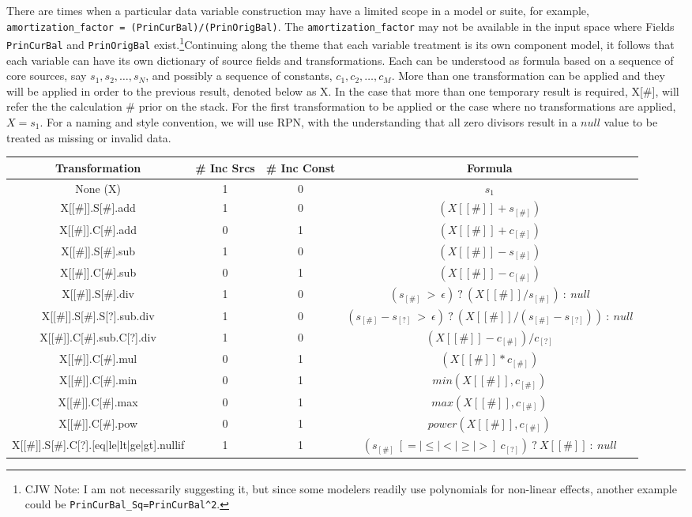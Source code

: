 \documentclass[10pt]{article}
\begin{document}
There are times when a particular data variable construction may have a limited scope in a model or suite, for example, {\tt
amortization\_factor = (PrinCurBal)/(PrinOrigBal)}.  The {\tt amortization\_factor} may not be available in the input space where Fields {\tt
PrinCurBal} and {\tt PrinOrigBal} exist.\ifcommentary \footnote{CJW Note:  I am not necessarily suggesting it, but since some modelers readily use
polynomials for non-linear effects, another example could be {\tt PrinCurBal\_Sq=PrinCurBal\^{}2}.}\fi  Continuing along the theme that each
variable treatment is its own component model, it follows that each variable can have its own dictionary of source fields and
transformations.  Each can be understood as formula based on a sequence of core sources, say $s_1, s_2,\ldots, s_N$, and possibly a sequence
of constants, $c_1, c_2, \ldots, c_M$. More than one transformation can be applied and they will be applied in order to the previous result,
denoted below as X.  In the case that more than one temporary result is required, X[\#], will refer the the calculation \# prior on the
stack.  For the first transformation to be applied or the case where no transformations are applied, $X=s_1$. For a naming and
style convention, we will use RPN, with the understanding that all zero divisors result in a $null$ value to be treated as missing or invalid data.

\noindent
\begin{tabular}{|c|c|c|c|}\hline
    Transformation &  \# Inc Srcs & \# Inc Const & Formula \tallstrut \\ \hline
    None (X)        & 1 & 0 & $s_1$ \tallstrut \\ \hline
    X[[\#]].S[\#].add    & 1 & 0 & $(X[[\#]]+s_{[\#]})$ \tallstrut \\ \hline
    X[[\#]].C[\#].add    & 0 & 1 & $(X[[\#]]+c_{[\#]})$ \tallstrut \\ \hline
    X[[\#]].S[\#].sub    & 1 & 0 & $(X[[\#]]-s_{[\#]})$ \tallstrut \\ \hline
    X[[\#]].C[\#].sub    & 0 & 1 & $(X[[\#]]-c_{[\#]})$ \tallstrut \\ \hline
    X[[\#]].S[\#].div    & 1 & 0 & $(s_{[\#]}~>~\epsilon)~?~(X[[\#]]/s_{[\#]})~:~null$ \tallstrut \\ \hline
    X[[\#]].S[\#].S[?].sub.div    & 1 & 0 & $(s_{[\#]}-s_{[?]}~>~\epsilon)~?~(X[[\#]]/(s_{[\#]}-s_{[?]}))~:~null$ \tallstrut \\ \hline
    X[[\#]].C[\#].sub.C[?].div    & 1 & 0 & $(X[[\#]]-c_{[\#]})/c_{[?]}$ \tallstrut \\ \hline
    X[[\#]].C[\#].mul    & 0 & 1 & $(X[[\#]]*c_{[\#]})$ \tallstrut \\ \hline
    X[[\#]].C[\#].min    & 0 & 1 & $min(X[[\#]],c_{[\#]})$ \tallstrut \\ \hline
    X[[\#]].C[\#].max    & 0 & 1 & $max(X[[\#]],c_{[\#]})$ \tallstrut \\ \hline
    X[[\#]].C[\#].pow    & 0 & 1 & $power(X[[\#]],c_{[\#]})$ \tallstrut \\ \hline
    X[[\#]].S[\#].C[?].[eq|le|lt|ge|gt].nullif  & 1 & 1 & $(s_{[\#]}~[=|\le|<|\ge|>]~c_{[?]})~?~X[[\#]]~:~null$ \tallstrut \\ \hline
\end{tabular}
\end{document}

